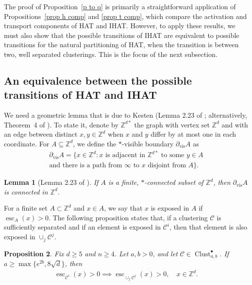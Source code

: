 \documentclass[11pt,reqno]{amsart}
\newtheorem{lemma}{Lemma}[section]
\newtheorem{proposition}[lemma]{Proposition}
\theoremstyle{definition}
\numberwithin{equation}{section}
\newcommand{\Z}{\mathbb{Z}}
\newcommand{\1}{\mathbf{1}}
\newcommand{\bdyvis}{\partial_{\mathrm{vis}}}
\DeclareMathOperator{\Es}{esc}
\newcommand{\CC}{\mathcal{C}}
\DeclareMathOperator{\Clust}{\mathrm{Clust}}
\begin{document}
The proof of Proposition~\ref{p to q} is primarily a straightforward application of Propositions~\ref{prop h comp} and \ref{prop t comp}, which compare the activation and transport components of HAT and IHAT. However, to apply these results, we must also show that the possible transitions of IHAT are equivalent to possible transitions for the natural partitioning of HAT, when the transition is between two, well separated clusterings. This is the focus of the next subsection.

\subsection{An equivalence between the possible transitions of HAT and IHAT}

We need a geometric lemma that is due to Kesten (Lemma 2.23 of \cite{kesten1986}; alternatively, Theorem~4 of \cite{timar2013}). To state it, denote by $\Z^{d\ast}$ the graph with vertex set $\Z^d$ and with an edge between distinct $x, y \in \Z^d$ when $x$ and $y$ differ by at most one in each coordinate. For $A \subseteq \Z^d$, we define the $\ast$-visible boundary $\bdyvis A$ as
\begin{multline}\label{bdyvis} \bdyvis A = \big\{x \in \Z^d: \text{$x$ is adjacent in $\Z^{d\ast}$ to some $y \in A$}\\ \text{and there is a path from $\infty$ to $x$ disjoint from $A$} \big\}.
\end{multline}

\begin{lemma}[Lemma 2.23 of \cite{kesten1986}]\label{kesten result}
If $A$ is a finite, $\ast$-connected subset of $\Z^d$, then $\bdyvis A$ is connected in $\Z^d$. 
\end{lemma}


For a finite set $A \subset \Z^d$ and $x \in A$, we say that $x$ is exposed in $A$ if $\Es_A (x) > 0$. The following proposition states that, if a clustering $\CC$ is sufficiently separated and if an element is exposed in $\CC^i$, then that element is also exposed in $\cup_j \CC^j$.

\begin{proposition}\label{help for at pairs}
Fix $d \geq 5$ and $n \geq 4$. Let $a, b > 0$, and let $\CC \in \Clust_{a,b}^\bullet$. If $a \geq \max\{e^{2b},8\sqrt{d}\}$, then
\begin{align*}
\Es_{\CC^i} (x) > 0 \implies \Es_{\cup_j \CC^j} (x) > 0, \quad x \in \Z^d.
\end{align*}
\end{proposition}
\end{document}
